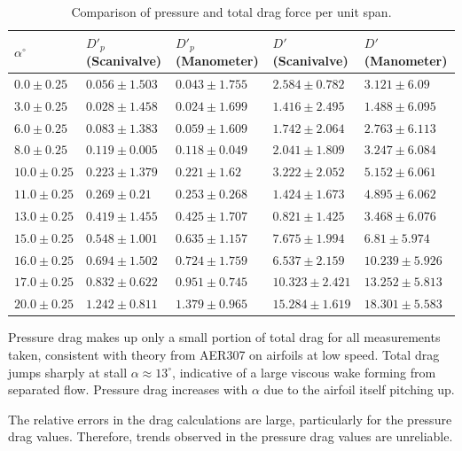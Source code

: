 \documentclass[runningheads]{llncs}
\begin{document}
\begin{table}[h]
\centering
\begin{tabular}{p{3cm}p{3cm}p{3cm}p{3cm}p{3cm}}
\toprule
$\alpha^\circ$ & $D'_p$ (Scanivalve) & $D'_p$ (Manometer) & $D'$ (Scanivalve) & $D'$ (Manometer) \\
\midrule
 $0.0\pm0.25$ &     $0.056\pm1.503$ &    $0.043\pm1.755$ &   $2.584\pm0.782$ &   $3.121\pm6.09$ \\
 $3.0\pm0.25$ &     $0.028\pm1.458$ &    $0.024\pm1.699$ &   $1.416\pm2.495$ &  $1.488\pm6.095$ \\
 $6.0\pm0.25$ &     $0.083\pm1.383$ &    $0.059\pm1.609$ &   $1.742\pm2.064$ &  $2.763\pm6.113$ \\
 $8.0\pm0.25$ &     $0.119\pm0.005$ &    $0.118\pm0.049$ &   $2.041\pm1.809$ &  $3.247\pm6.084$ \\
$10.0\pm0.25$ &     $0.223\pm1.379$ &     $0.221\pm1.62$ &   $3.222\pm2.052$ &  $5.152\pm6.061$ \\
$11.0\pm0.25$ &      $0.269\pm0.21$ &    $0.253\pm0.268$ &   $1.424\pm1.673$ &  $4.895\pm6.062$ \\
$13.0\pm0.25$ &     $0.419\pm1.455$ &    $0.425\pm1.707$ &   $0.821\pm1.425$ &  $3.468\pm6.076$ \\
$15.0\pm0.25$ &     $0.548\pm1.001$ &    $0.635\pm1.157$ &   $7.675\pm1.994$ &   $6.81\pm5.974$ \\
$16.0\pm0.25$ &     $0.694\pm1.502$ &    $0.724\pm1.759$ &   $6.537\pm2.159$ & $10.239\pm5.926$ \\
$17.0\pm0.25$ &     $0.832\pm0.622$ &    $0.951\pm0.745$ &  $10.323\pm2.421$ & $13.252\pm5.813$ \\
$20.0\pm0.25$ &     $1.242\pm0.811$ &    $1.379\pm0.965$ &  $15.284\pm1.619$ & $18.301\pm5.583$ \\
\bottomrule
\end{tabular}
\caption{Comparison of pressure and total drag force per unit span.}
\label{tab:pressure_comparison}
\end{table}

Pressure drag makes up only a small portion of total drag for all measurements taken, consistent with theory from AER307 on airfoils at low speed. Total drag jumps sharply at stall $\alpha \approx 13^\circ$, indicative of a large viscous wake forming from separated flow. Pressure drag increases with $\alpha$ due to the airfoil itself pitching up. 

The relative errors in the drag calculations are large, particularly for the pressure drag values. Therefore, trends observed in the pressure drag values are unreliable.
\end{document}
